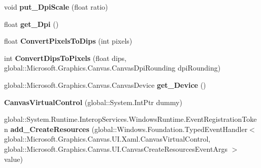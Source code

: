 \begin{DoxyCompactItemize}
void {\bfseries put\+\_\+\+Dpi\+Scale} (float ratio)
\item 
\mbox{\label{class_microsoft_1_1_graphics_1_1_canvas_1_1_u_i_1_1_xaml_1_1_canvas_virtual_control_a904326acb238d05c8b33c83e93d02c97}} 
float {\bfseries get\+\_\+\+Dpi} ()
\item 
\mbox{\label{class_microsoft_1_1_graphics_1_1_canvas_1_1_u_i_1_1_xaml_1_1_canvas_virtual_control_ad9fa8ad680693ecd08e5d86a065f7784}} 
float {\bfseries Convert\+Pixels\+To\+Dips} (int pixels)
\item 
\mbox{\label{class_microsoft_1_1_graphics_1_1_canvas_1_1_u_i_1_1_xaml_1_1_canvas_virtual_control_a03057031bb915e5c65afa64e5dcd1474}} 
int {\bfseries Convert\+Dips\+To\+Pixels} (float dips, global\+::\+Microsoft.\+Graphics.\+Canvas.\+Canvas\+Dpi\+Rounding dpi\+Rounding)
\item 
\mbox{\label{class_microsoft_1_1_graphics_1_1_canvas_1_1_u_i_1_1_xaml_1_1_canvas_virtual_control_a81a72cc0fa39cc066e7b2ebe1c69c058}} 
global\+::\+Microsoft.\+Graphics.\+Canvas.\+Canvas\+Device {\bfseries get\+\_\+\+Device} ()
\item 
\mbox{\label{class_microsoft_1_1_graphics_1_1_canvas_1_1_u_i_1_1_xaml_1_1_canvas_virtual_control_a09dd36cea5da7f54fbb16a91d4df4e72}} 
{\bfseries Canvas\+Virtual\+Control} (global\+::\+System.\+Int\+Ptr dummy)
\item 
\mbox{\label{class_microsoft_1_1_graphics_1_1_canvas_1_1_u_i_1_1_xaml_1_1_canvas_virtual_control_a4223ddace384a3165f478a4d7db7b73a}} 
global\+::\+System.\+Runtime.\+Interop\+Services.\+Windows\+Runtime.\+Event\+Registration\+Token {\bfseries add\+\_\+\+Create\+Resources} (global\+::\+Windows.\+Foundation.\+Typed\+Event\+Handler$<$ global\+::\+Microsoft.\+Graphics.\+Canvas.\+U\+I.\+Xaml.\+Canvas\+Virtual\+Control, global\+::\+Microsoft.\+Graphics.\+Canvas.\+U\+I.\+Canvas\+Create\+Resources\+Event\+Args $>$ value)

\end{DoxyCompactItemize}
